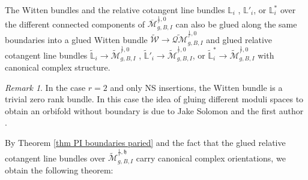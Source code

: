 \documentclass[11pt]{amsart}
\newtheorem{thm}[dummy]{Theorem}
\theoremstyle{definition}
\theoremstyle{remark}
\newtheorem{rmk}[dummy]{Remark}
\newcommand{\<}{\left<}
\renewcommand{\>}{\right>}
\numberwithin{equation}{section}
\def\Mbar{{\overline{\mathcal M}}}
\def\h{{\mathfrak h}}
\begin{document}
    
    The Witten bundles and the relative cotangent line bundles $\mathbb L_i$%
, $\mathbb L'_i$, or %
$\mathbb L_i^*$ over the different connected components of $\Mbar^{\frac{1}{r},0}_{g,B,I}$  can also be glued along the same boundaries into a glued Witten bundle $\widetilde{\mathcal W}\to\widetilde{\mathcal {QM}}^{\frac{1}{r},0}_{g,B,I}$ and glued relative cotangent line bundles $\widetilde{\mathbb L}_i\to\widetilde{\mathcal M}^{\frac{1}{r},0}_{g,B,I}$%
, $\widetilde{\mathbb L}'_i\to\widetilde{\mathcal M}^{\frac{1}{r},0}_{g,B,I}$, or $\widetilde{\mathbb L}^*_i\to\widetilde{\mathcal M}^{\frac{1}{r},0}_{g,B,I}$ %
with canonical complex structure.
\begin{rmk}
In the case $r=2$ and only %
NS insertions, the %
Witten bundle is a trivial zero rank bundle. In this case the idea of gluing different moduli spaces to obtain an orbifold without boundary is due to Jake Solomon and the %
first  author %
\cite{ST_unpublished}. 
\end{rmk}
     By Theorem \ref{thm  PI boundaries paried} and the fact that the glued relative cotangent line %
bundles over $\widetilde{\mathcal M}^{\frac{1}{r},\h}_{g,B,I}$ carry canonical complex orientations, we obtain the following theorem:
\end{document}
